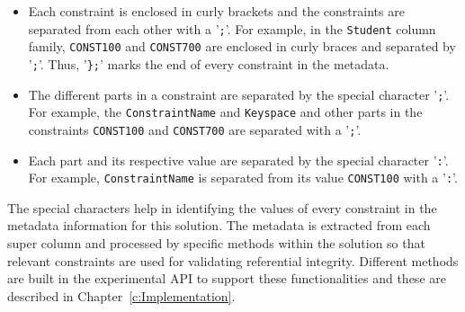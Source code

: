 		\begin{itemize}
			\item Each constraint is enclosed in curly brackets and the
			constraints are separated from each other with a
			'\texttt{;}'.  For example, in the \texttt{Student} column
			family,  \texttt{CONST100} and \texttt{CONST700} are enclosed in curly braces
			and separated by '\texttt{;}'. 
			Thus,  '\texttt{\};}' marks the end of every constraint in the metadata. 
		
		
			\item The different parts in a constraint are separated by the special character
			'\texttt{;}'.  For example,  the \texttt{ConstraintName}
			and \texttt{Keyspace} and other parts in the constraints \texttt{CONST100} and
						 \texttt{CONST700} are separated with a '\texttt{;}'. 
			 
			 
			\item Each part and its respective value are separated by the special
			character '\texttt{:}'.  For example,  \texttt{ConstraintName} is separated from
			its value \texttt{CONST100} with a '\texttt{:}'.  
			
		\end{itemize}
		

		
The special characters help in identifying the values of every constraint in the
metadata information for this solution.  The metadata is extracted from each
super column and processed by specific methods within the solution so that
relevant constraints are used for validating referential integrity.  Different
methods are built in the experimental \ac{API} to support these functionalities
and these are described in Chapter~\ref{c:Implementation}. 


